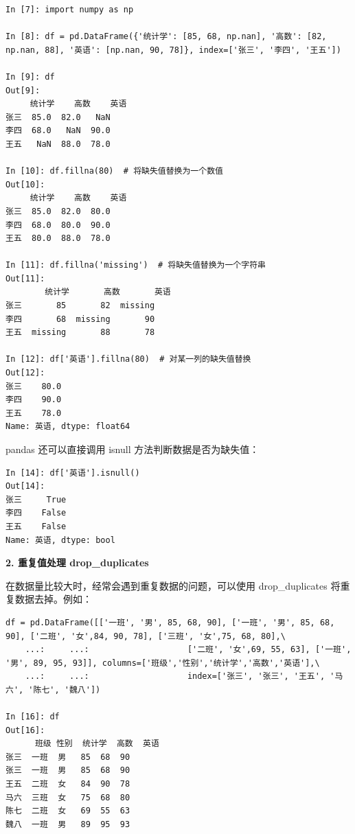 \begin{lstlisting}[Language=Python]
In [7]: import numpy as np

In [8]: df = pd.DataFrame({'统计学': [85, 68, np.nan], '高数': [82, np.nan, 88], '英语': [np.nan, 90, 78]}, index=['张三', '李四', '王五'])

In [9]: df
Out[9]:
     统计学    高数    英语
张三  85.0  82.0   NaN
李四  68.0   NaN  90.0
王五   NaN  88.0  78.0

In [10]: df.fillna(80)  # 将缺失值替换为一个数值
Out[10]:
     统计学    高数    英语
张三  85.0  82.0  80.0
李四  68.0  80.0  90.0
王五  80.0  88.0  78.0

In [11]: df.fillna('missing')  # 将缺失值替换为一个字符串
Out[11]:
        统计学       高数       英语
张三       85       82  missing
李四       68  missing       90
王五  missing       88       78

In [12]: df['英语'].fillna(80)  # 对某一列的缺失值替换
Out[12]:
张三    80.0
李四    90.0
王五    78.0
Name: 英语, dtype: float64
\end{lstlisting}

pandas 还可以直接调用 isnull 方法判断数据是否为缺失值：

\begin{lstlisting}[Language=Python]
In [14]: df['英语'].isnull()
Out[14]:
张三     True
李四    False
王五    False
Name: 英语, dtype: bool
\end{lstlisting}


\vspace{3pt}
\noindent\textbf{2. 重复值处理 drop\_duplicates}
\vspace{3pt}

在数据量比较大时，经常会遇到重复数据的问题，可以使用 drop\_duplicates 将重复数据去掉。例如：

\begin{lstlisting}[Language=Python]
df = pd.DataFrame([['一班', '男', 85, 68, 90], ['一班', '男', 85, 68, 90], ['二班', '女',84, 90, 78], ['三班', '女',75, 68, 80],\
    ...:     ...:                    ['二班', '女',69, 55, 63], ['一班', '男', 89, 95, 93]], columns=['班级','性别','统计学','高数','英语'],\
    ...:     ...:                    index=['张三', '张三', '王五', '马六', '陈七', '魏八'])

In [16]: df
Out[16]:
      班级 性别  统计学  高数  英语
张三  一班  男   85  68  90
张三  一班  男   85  68  90
王五  二班  女   84  90  78
马六  三班  女   75  68  80
陈七  二班  女   69  55  63
魏八  一班  男   89  95  93
\end{lstlisting}

